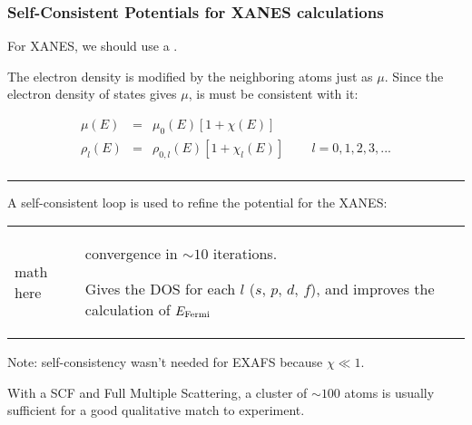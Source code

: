 
\begin{frame} \frametitle{Self-Consistent Potentials for XANES calculations}
  \small
  \begin{cenpage}{100mm}\setlength{\baselineskip}{10pt}

    \vmm
   
    For XANES, we should use a  {}.   

    \vmm
    
    The electron density is modified by the neighboring atoms just as
    $\mu$.  Since the electron density of states gives $\mu$, is must be
    consistent with it:

    \vspace{-1mm}

    \begin{eqnarray*} 
      \mu(E)      &=&  \mu_0(E) [ 1 + \chi(E) ]  \qquad   \qquad   \qquad   \qquad  \\
      \rho_l(E)   &=&  \rho_{0,l}(E) [ 1 + \chi_l(E) ]  \,\qquad l = 0,1,2,3,...\\
    \end{eqnarray*}

    \vspace{-4mm} \hrule \vmm

    A self-consistent loop is used to refine the potential for the XANES:
    
    \vmm

    \begin{tabular}{ll}
      \hspace{-4mm}  \begin{minipage}{60mm}

        math here
        
      \end{minipage} & 
      \begin{minipage}{42mm}
        convergence in $\sim 10$ iterations.
        
        
        Gives the DOS for each $l$ ($s$, $p$, $d$, $f$), and improves
        the calculation of $E_{\rm Fermi}$
      \end{minipage} \\
    \end{tabular}
    \vmm
      
    Note: self-consistency  wasn't needed for EXAFS because $\chi \ll 1 $.
    
    
    \vmm 
    
    With a SCF and Full Multiple Scattering, a cluster of $\sim 100$
    atoms  is usually sufficient for a good qualitative match to experiment.
    
  \end{cenpage}
\vfill
\end{frame} 

